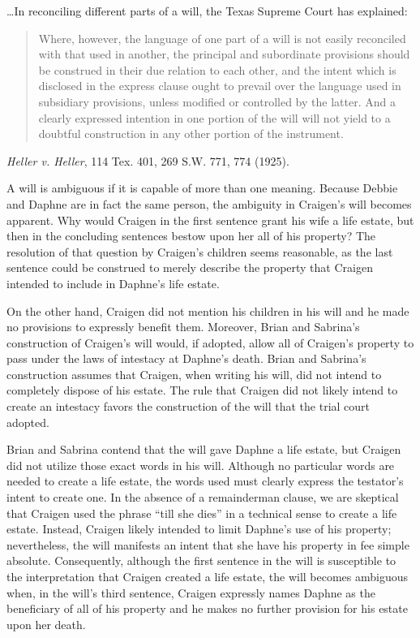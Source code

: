\dots In reconciling different parts of a will, the Texas Supreme Court has
explained:
\begin{quote}
Where, however, the language of one part of a will is not easily reconciled with
that used in another, the principal and subordinate provisions should be
construed in their due relation to each other, and the intent which is
disclosed in the express clause ought to prevail over the language used in
subsidiary provisions, unless modified or controlled by the latter. And a
clearly expressed intention in one portion of the will will not yield to a
doubtful construction in any other portion of the instrument.
\end{quote}
\textit{Heller v. Heller}, 114 Tex. 401, 269 S.W. 771, 774 (1925).


A will is ambiguous if it is capable of more than one meaning. Because Debbie
and Daphne are in fact the same person, the ambiguity in Craigen's will becomes
apparent. Why would Craigen in the first sentence grant his wife a life estate,
but then in the concluding sentences bestow upon her all of his property? The
resolution of that question by Craigen's children seems reasonable, as the last
sentence could be construed to merely describe the property that Craigen
intended to include in Daphne's life estate.

On the other hand, Craigen did not mention his children in his will and he made
no provisions to expressly benefit them. Moreover, Brian and Sabrina's
construction of Craigen's will would, if adopted, allow all of Craigen's
property to pass under the laws of intestacy at Daphne's death. Brian and
Sabrina's construction assumes that Craigen, when writing his will, did not
intend to completely dispose of his estate. The rule that Craigen did not
likely intend to create an intestacy favors the construction of the will that
the trial court adopted.

Brian and Sabrina contend that the will gave Daphne a life estate, but Craigen
did not utilize those exact words in his will. Although no particular words are
needed to create a life estate, the words used must clearly express the
testator's intent to create one. In the absence of a remainderman clause, we
are skeptical that Craigen used the phrase ``till she dies'' in a technical
sense to create a life estate. Instead, Craigen likely intended to limit
Daphne's use of his property; nevertheless, the will manifests an intent that
she have his property in fee simple absolute. Consequently, although the first
sentence in the will is susceptible to the interpretation that Craigen created
a life estate, the will becomes ambiguous when, in the will's third sentence,
Craigen expressly names Daphne as the beneficiary of all of his property and he
makes no further provision for his estate upon her death.

